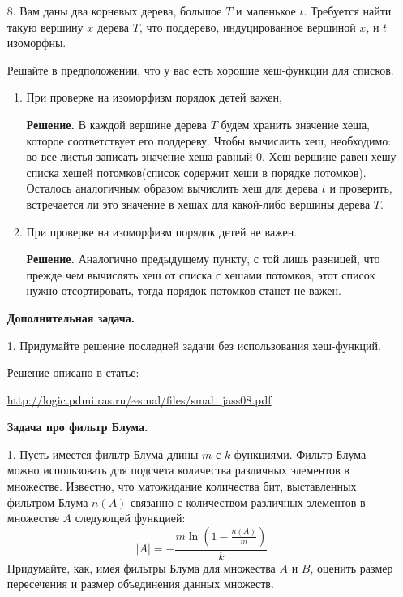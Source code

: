\begin{enumerate}
	\item[8.] Вам даны два корневых дерева, большое $T$ и маленькое $t$. Требуется найти такую вершину $x$
	дерева $T$, что поддерево, индуцированное вершиной $x$, и $t$ изоморфны.
	
	Решайте в предположении, что у вас есть хорошие хеш-функции для списков.
	
	\begin{enumerate}
		\item При проверке на изоморфизм порядок детей важен,
		
		\textbf{Решение.} В каждой вершине дерева $T$ будем хранить значение хеша, которое соответствует его 
		поддереву. Чтобы вычислить хеш, необходимо: во все листья записать значение хеша равный $0$. Хеш вершине 
		равен хешу списка хешей потомков(список содержит хеши в порядке потомков). Осталось аналогичным образом 
		вычислить хеш для дерева $t$ и проверить, встречается ли это значение в хешах для какой-либо вершины 
		дерева $T$. 
		
		\item При проверке на изоморфизм порядок детей не важен.
		
		\textbf{Решение.} Аналогично предыдущему пункту, с той лишь разницей, что прежде чем вычислять хеш от 
		списка с хешами потомков, этот список нужно отсортировать, тогда порядок потомков станет не важен. 
	\end{enumerate}
	
	\textbf{Дополнительная задача.}
	
	\item[1.] Придумайте решение последней задачи без использования хеш-функций.
	
	Решение описано в статье:
	
	\url{http://logic.pdmi.ras.ru/~smal/files/smal_jass08.pdf}
	
	\textbf{Задача про фильтр Блума.}
	
	\item[1.] Пусть имеется фильтр Блума длины $m$ с $k$ функциями. Фильтр Блума можно использовать для подсчета количества 
	различных элементов в множестве. Известно, что матожидание количества бит, выставленных фильтром Блума $n(A)$ 
	связанно с количеством различных элементов в множестве $A$ следующей функцией:
	\begin{equation}
		|A| = - \dfrac{m \ln (1-\frac{n(A)}{m})}{k}
	\end{equation}
	Придумайте, как, имея фильтры Блума для множества $A$ и $B$, оценить размер пересечения и размер объединения 
	данных множеств.
	
\end{enumerate}


